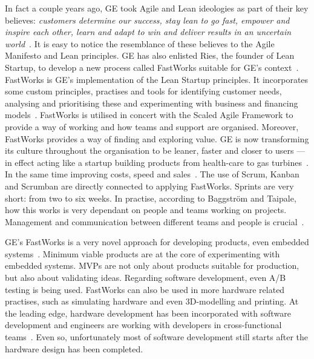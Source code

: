 \documentclass[english]{tktltiki2}
\begin{document}
In fact a couple years ago, GE took Agile and Lean ideologies as part of their key believes: \emph{customers determine our success, stay lean to go fast, empower and inspire each other, learn and adapt to win and deliver results in an uncertain world}~\cite{BT15}. It is easy to notice the resemblance of these believes to the Agile Manifesto and Lean principles. GE has also enlisted Ries, the founder of Lean Startup, to develop a new process called FastWorks suitable for GE’s context~\cite{GE13, Clo14, Pow14, BT15}. FastWorks is GE’s implementation of the Lean Startup principles. It incorporates some custom principles, practises and tools for identifying customer needs, analysing and prioritising these and experimenting with business and financing models~\cite{BT15}. FastWorks is utilised in concert with the Scaled Agile Framework to provide a way of working and how teams and support are organised. Moreover, FastWorks provides a way of finding and exploring value. GE is now transforming its culture throughout the organisation to be leaner, faster and closer to users — in effect acting like a startup building products from health-care to gas turbines~\cite{GE13, Clo14, Pow14}. In the same time improving costs, speed and sales~\cite{Pow14}. The use of Scrum, Kanban and Scrumban are directly connected to applying FastWorks. Sprints are very short: from two to six weeks. In practise, according to Baggström and Taipale, how this works is very dependant on people and teams working on projects. Management and communication between different teams and people is crucial~\cite{BT15}.

GE’s FastWorks is a very novel approach for developing products, even embedded systems~\cite{BT15}. Minimum viable products are at the core of experimenting with embedded systems. MVPs are not only about products suitable for production, but also about validating ideas. Regarding software development, even A/B testing is being used. FastWorks can also be used in more hardware related practises, such as simulating hardware and even 3D-modelling and printing. At the leading edge, hardware development has been incorporated with software development and engineers are working with developers in cross-functional teams~\cite{BT15}. Even so, unfortunately most of software development still starts after the hardware design has been completed.
\end{document}
